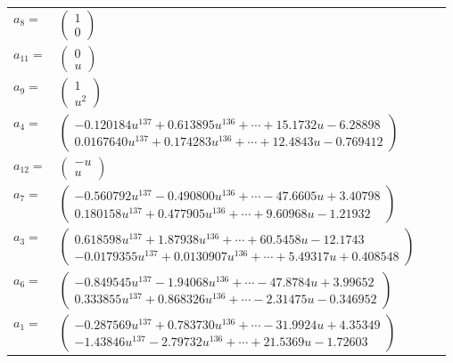 \documentclass[1p]{elsarticle_modified}
\theoremstyle{definition}
\begin{document}
\begin{tabular}{m{7pt} m{180pt} m{7pt} m{180pt} }
\flushright $a_{8}=$&$\begin{pmatrix}1\\0\end{pmatrix}$ \\
\flushright $a_{11}=$&$\begin{pmatrix}0\\u\end{pmatrix}$ \\
\flushright $a_{9}=$&$\begin{pmatrix}1\\u^2\end{pmatrix}$ \\
\flushright $a_{4}=$&$\begin{pmatrix}-0.120184 u^{137}+0.613895 u^{136}+\cdots+15.1732 u-6.28898\\0.0167640 u^{137}+0.174283 u^{136}+\cdots+12.4843 u-0.769412\end{pmatrix}$ \\
\flushright $a_{12}=$&$\begin{pmatrix}- u\\u\end{pmatrix}$ \\
\flushright $a_{7}=$&$\begin{pmatrix}-0.560792 u^{137}-0.490800 u^{136}+\cdots-47.6605 u+3.40798\\0.180158 u^{137}+0.477905 u^{136}+\cdots+9.60968 u-1.21932\end{pmatrix}$ \\
\flushright $a_{3}=$&$\begin{pmatrix}0.618598 u^{137}+1.87938 u^{136}+\cdots+60.5458 u-12.1743\\-0.0179355 u^{137}+0.0130907 u^{136}+\cdots+5.49317 u+0.408548\end{pmatrix}$ \\
\flushright $a_{6}=$&$\begin{pmatrix}-0.849545 u^{137}-1.94068 u^{136}+\cdots-47.8784 u+3.99652\\0.333855 u^{137}+0.868326 u^{136}+\cdots-2.31475 u-0.346952\end{pmatrix}$ \\
\flushright $a_{1}=$&$\begin{pmatrix}-0.287569 u^{137}+0.783730 u^{136}+\cdots-31.9924 u+4.35349\\-1.43846 u^{137}-2.79732 u^{136}+\cdots+21.5369 u-1.72603\end{pmatrix}$ \\

\end{tabular}
\end{document}
